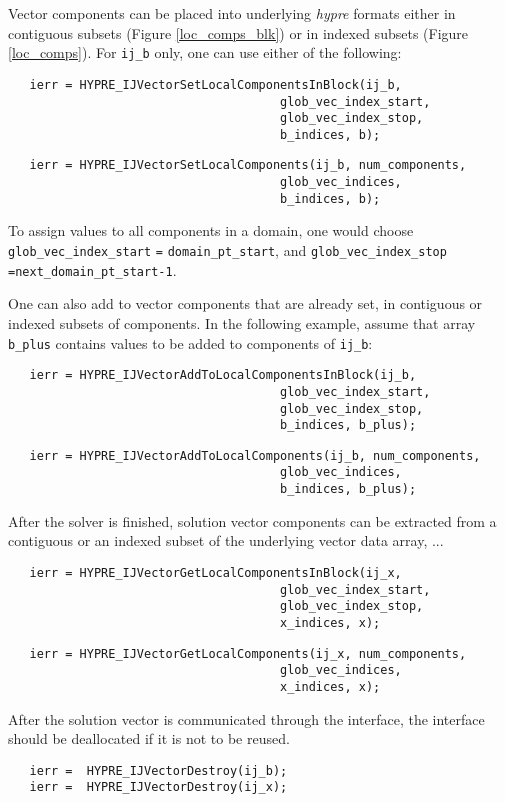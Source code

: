 \noindent Vector components can be placed into
underlying {\slshape hypre} formats either in 
contiguous subsets (Figure \ref{loc_comps_blk}) or in
indexed subsets (Figure \ref{loc_comps}). For \verb+ij_b+
only, one can use either of the following:

\begin{verbatim}
   ierr = HYPRE_IJVectorSetLocalComponentsInBlock(ij_b,
                                      glob_vec_index_start,
                                      glob_vec_index_stop,
                                      b_indices, b);
\end{verbatim}
\begin{verbatim}
   ierr = HYPRE_IJVectorSetLocalComponents(ij_b, num_components,
                                      glob_vec_indices,
                                      b_indices, b);
\end{verbatim}

\noindent To assign values to all components in a domain, one would
choose \verb+glob_vec_index_start+ \verb+=+ \verb+domain_pt_start+,
and \verb+glob_vec_index_stop+ \verb+=+\verb+next_domain_pt_start-1+.

One can also add to vector components that are already set, in
contiguous or indexed subsets of components.
In the following example,
assume that array \verb+b_plus+
contains values to be added to components of \verb+ij_b+:

\begin{verbatim}
   ierr = HYPRE_IJVectorAddToLocalComponentsInBlock(ij_b,
                                      glob_vec_index_start,
                                      glob_vec_index_stop,
                                      b_indices, b_plus); 
\end{verbatim}
\begin{verbatim}
   ierr = HYPRE_IJVectorAddToLocalComponents(ij_b, num_components,
                                      glob_vec_indices,
                                      b_indices, b_plus);
\end{verbatim}

\noindent After the solver is finished, solution vector components
can be extracted from a contiguous or an indexed subset of
the underlying vector data array, ...

\begin{verbatim}
   ierr = HYPRE_IJVectorGetLocalComponentsInBlock(ij_x,
                                      glob_vec_index_start,
                                      glob_vec_index_stop,
                                      x_indices, x);
\end{verbatim}
\begin{verbatim}
   ierr = HYPRE_IJVectorGetLocalComponents(ij_x, num_components,
                                      glob_vec_indices,
                                      x_indices, x);
\end{verbatim}

\noindent After the solution vector is communicated through the interface,
the interface should be deallocated if it is not to be reused.

\begin{verbatim}
   ierr =  HYPRE_IJVectorDestroy(ij_b);
   ierr =  HYPRE_IJVectorDestroy(ij_x);
\end{verbatim}



